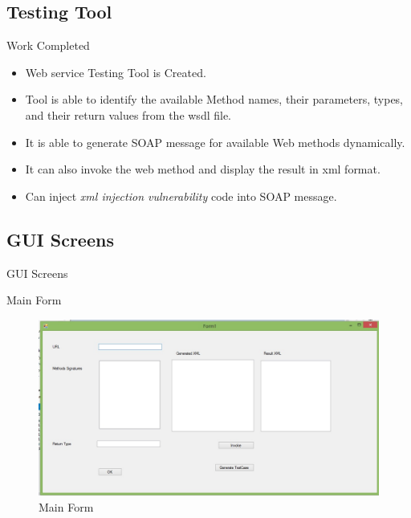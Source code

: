\documentclass{beamer}
\begin{document}
\subsection{Testing Tool}
\begin{frame}{Work Completed}{}
	\begin{itemize}
		\item Web service Testing Tool is Created.
		
		\item Tool is able to identify the available Method names, their parameters, types, and their return values from the wsdl file.
		\item It is able to generate SOAP message for available Web methods dynamically.
		\item It can also invoke the web method and display the result in xml format.
		\item Can inject \textit{xml injection vulnerability} code into SOAP message.
	\end{itemize}
\end{frame}
\subsection{GUI Screens}
\begin{frame}{GUI Screens}
	\begin{block}{Main Form}
		\begin{figure}
\centering
\includegraphics[width=0.7\linewidth]{MainForm}
\caption{Main Form}
\label{fig:MainForm}
		\end{figure}


	\end{block}

\end{frame}
\end{document}
